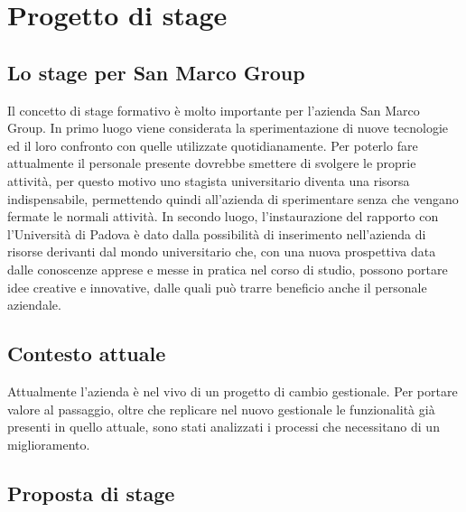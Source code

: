 
\chapter{Progetto di stage}
\label{cap:progetto-di-stage}


\section{Lo stage per San Marco Group}

Il concetto di stage formativo è molto importante per l’azienda San Marco Group.
In primo luogo viene considerata la sperimentazione di nuove tecnologie ed il loro confronto con quelle utilizzate quotidianamente. Per poterlo fare attualmente il personale presente dovrebbe smettere di svolgere le proprie attività, per questo motivo uno stagista universitario diventa una risorsa indispensabile, permettendo quindi all’azienda di sperimentare senza che vengano fermate le normali attività.
In secondo luogo, l’instaurazione del rapporto con l’Università di Padova è dato dalla possibilità di inserimento nell’azienda di risorse derivanti dal mondo universitario che, con una nuova prospettiva data dalle conoscenze apprese e messe in pratica nel corso di studio, possono portare idee creative e innovative, dalle quali può trarre beneficio anche il personale aziendale.


\section{Contesto attuale}

Attualmente l’azienda è nel vivo di un progetto di cambio gestionale. Per portare valore al passaggio, oltre che replicare nel nuovo gestionale le funzionalità già presenti in quello attuale, sono stati analizzati i processi che necessitano di un miglioramento.


\section{Proposta di stage}

